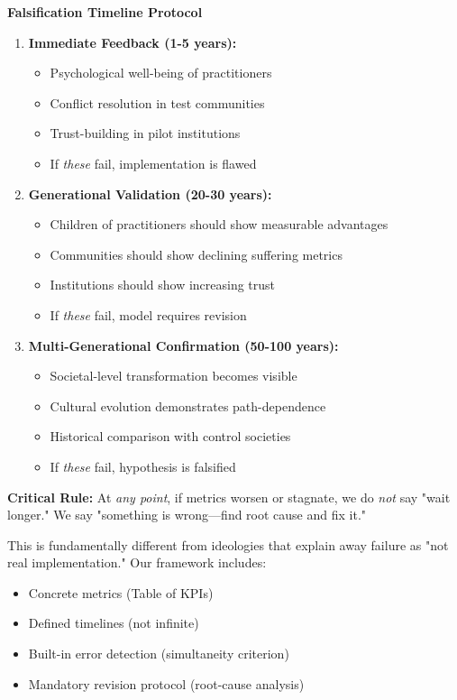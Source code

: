\documentclass[11pt,a4paper]{article}
\theoremstyle{definition}
\theoremstyle{remark}
\begin{document}
\begin{mdframed}[backgroundcolor=green!5]
\textbf{Falsification Timeline Protocol}

\begin{enumerate}
\item \textbf{Immediate Feedback (1-5 years):}
\begin{itemize}
\item Psychological well-being of practitioners
\item Conflict resolution in test communities
\item Trust-building in pilot institutions
\item If \textit{these} fail, implementation is flawed
\end{itemize}

\item \textbf{Generational Validation (20-30 years):}
\begin{itemize}
\item Children of practitioners should show measurable advantages
\item Communities should show declining suffering metrics
\item Institutions should show increasing trust
\item If \textit{these} fail, model requires revision
\end{itemize}

\item \textbf{Multi-Generational Confirmation (50-100 years):}
\begin{itemize}
\item Societal-level transformation becomes visible
\item Cultural evolution demonstrates path-dependence
\item Historical comparison with control societies
\item If \textit{these} fail, hypothesis is falsified
\end{itemize}
\end{enumerate}

\textbf{Critical Rule:} At \textit{any point}, if metrics worsen or stagnate, we do \textit{not} say "wait longer." We say "something is wrong—find root cause and fix it."

This is fundamentally different from ideologies that explain away failure as "not real implementation." Our framework includes:
\begin{itemize}
\item Concrete metrics (Table of KPIs)
\item Defined timelines (not infinite)
\item Built-in error detection (simultaneity criterion)
\item Mandatory revision protocol (root-cause analysis)
\end{itemize}


\end{mdframed}
\end{document}
